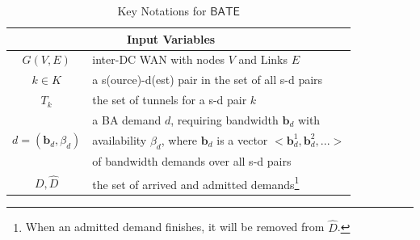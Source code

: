\documentclass[sigconf]{acmart}
\begin{document}
\begin{table}[h!]
\small
\centering
\caption{Key Notations for $\mathsf{BATE}$}\label{Notation}
\renewcommand{\arraystretch}{1.0}
\begin{tabular}{ccccccc}  \toprule \toprule 
\setlength{\tabcolsep}{5pt}
&\textbf{Input Variables}\\
\hline
$G(V,E)$ &\multicolumn{6}{|l}{inter-DC WAN with nodes $V$ and Links $E$}\\
\hline
$k\in K$ &\multicolumn{6}{|l}{a s(ource)-d(est) pair in the set of all s-d pairs}\\
\hline
$T_{k}$ &\multicolumn{6}{|l}{the set of tunnels for a s-d pair $k$}\\
\hline
\multirow{3}{*}{$d\!=\!(\mathbf{b}_d, \beta_d)$}&\multicolumn{6}{|l}{a BA demand $d$, requiring bandwidth $\mathbf{b}_d$ with }\\
&\multicolumn{6}{|l}{ availability $\beta_d$, where $\mathbf{b}_d$ is a vector $<\mathbf{b}^1_d, \mathbf{b}^2_d, ...>$}\\
&\multicolumn{6}{|l}{of bandwidth demands over all s-d pairs} \\
\hline
$D, \hat{D}$&\multicolumn{6}{|l}{the set of arrived and admitted demands\footnote{When an admitted demand finishes, it will be removed from $\hat{D}$.} }\\

\end{tabular}
\end{table}
\end{document}
